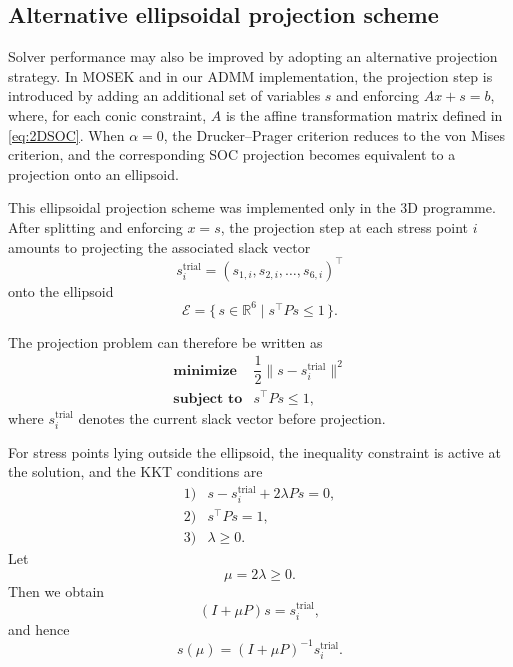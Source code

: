  

\subsection{Alternative ellipsoidal projection scheme}

Solver performance may also be improved by adopting an alternative projection strategy. In MOSEK and in our ADMM implementation, the projection step is introduced by adding an additional set of variables \(s\) and enforcing
$Ax + s = b$,
where, for each conic constraint, \(A\) is the affine transformation matrix defined in \eqref{eq:2DSOC}. When \(\alpha = 0\), the Drucker--Prager criterion reduces to the von Mises criterion, and the corresponding SOC projection becomes equivalent to a projection onto an ellipsoid.

This ellipsoidal projection scheme was implemented only in the 3D programme. After splitting and enforcing \(x = s\), the projection step at each stress point \(i\) amounts to projecting the associated slack vector
\[
s_i^{\mathrm{trial}} = (s_{1,i}, s_{2,i}, \dots, s_{6,i})^\top
\]
onto the ellipsoid
\[
\mathcal{E} = \{\, s \in \mathbb{R}^6 \mid s^\top P s \leq 1 \,\}.
\]

The projection problem can therefore be written as
\begin{equation}
\begin{array}{ll}
\textbf{minimize}   & \dfrac{1}{2}\|s - s_i^{\mathrm{trial}}\|^2 \\[4pt]
\textbf{subject to} & s^\top P s \leq 1,
\end{array}
\label{eq:ELP}
\end{equation}
where \(s_i^{\mathrm{trial}}\) denotes the current slack vector before projection.

For stress points lying outside the ellipsoid, the inequality constraint is active at the solution, and the KKT conditions are
\begin{equation}
\begin{array}{ll}
1) & s - s_i^{\mathrm{trial}} + 2\lambda P s = 0, \\[4pt]
2) & s^\top P s = 1, \\[4pt]
3) & \lambda \geq 0.
\end{array}
\label{eq:KKT_ELP}
\end{equation}
Let
\[
\mu = 2\lambda \geq 0.
\]
Then we obtain
\begin{equation}
(I + \mu P)s = s_i^{\mathrm{trial}},
\end{equation}
and hence
\begin{equation}
s(\mu) = (I + \mu P)^{-1} s_i^{\mathrm{trial}}.
\end{equation}

